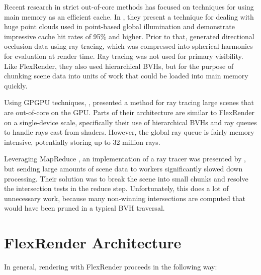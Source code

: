 \documentclass[a4paper,twoside]{article}
\begin{document}
Recent research in strict out-of-core methods has focused on techniques for
using main memory as an efficient cache. In \cite{tabellion:2011}, they present
a technique for dealing with huge point clouds used in point-based global
illumination and demonstrate impressive cache hit rates of 95\% and higher.
Prior to that, \cite{pantaleoni:2010} generated directional occlusion data
using ray tracing, which was compressed into spherical harmonics for evaluation
at render time. Ray tracing was not used for primary visibility. Like FlexRender,
they also used hierarchical BVHs, but for the purpose of chunking scene data
into units of work that could be loaded into main memory quickly.

Using GPGPU techniques, \cite{garanzha:2011}, presented a method for ray
tracing large scenes that are out-of-core on the GPU. Parts of their
architecture are similar to FlexRender on a single-device scale, specifically
their use of hierarchical BVHs and ray queues to handle rays cast from shaders.
However, the global ray queue is fairly memory intensive, potentially storing
up to 32 million rays.

Leveraging MapReduce \cite{dean:2004}, an implementation of a ray tracer was
presented by \cite{northam:2011}, but sending large amounts of scene data to
workers significantly slowed down processing. Their solution was to break the
scene into small chunks and resolve the intersection tests in the reduce step.
Unfortunately, this does a lot of unnecessary work, because many non-winning
intersections are computed that would have been pruned in a typical BVH
traversal.

\section{FlexRender Architecture}
\label{architecture}

In general, rendering with FlexRender proceeds in the following way:
\end{document}
